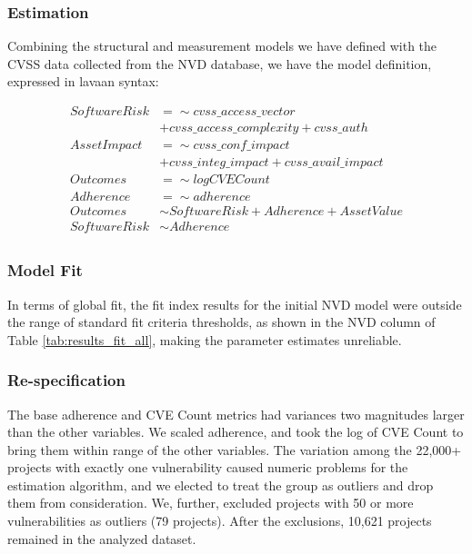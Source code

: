 \subsubsection{Estimation}

Combining the structural and measurement models we have defined with the CVSS data collected from the NVD database, we have the model definition, expressed in lavaan syntax: 

\begin{equation}
\begin{split}
	SoftwareRisk &=\sim cvss\_access\_vector \\ 
	&+ cvss\_access\_complexity + cvss\_auth\\
	AssetImpact &=\sim cvss\_conf\_impact\\
	&+ cvss\_integ\_impact + cvss\_avail\_impact\\
	Outcomes &=\sim logCVECount\\
	Adherence &=\sim adherence\\
	Outcomes &\sim SoftwareRisk + Adherence + AssetValue\\
	SoftwareRisk &\sim Adherence\\
\end{split}
\end{equation}		

\subsubsection{Model Fit} 
In terms of global fit, the fit index results for the initial NVD model were outside the range of standard fit criteria thresholds, as shown in the NVD column of Table \ref{tab:results_fit_all}, making the parameter estimates unreliable. 

\subsubsection{Re-specification}
The base adherence and CVE Count metrics had variances two magnitudes larger than the other variables. We scaled adherence, and took the log of CVE Count to bring them within range of the other variables. The variation among the 22,000+ projects with exactly one vulnerability caused numeric problems for the estimation algorithm, and we elected to treat the group as outliers and drop them from consideration. We, further, excluded projects with 50 or more vulnerabilities as outliers (79 projects). After the exclusions, 10,621 projects remained in the analyzed dataset.

